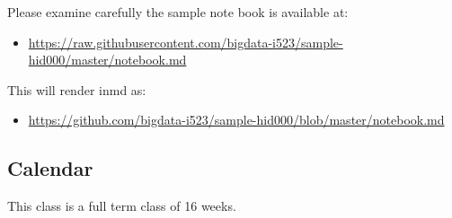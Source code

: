 Please examine carefully the sample note book is available at:

\begin{itemize}

\item
  \url{https://raw.githubusercontent.com/bigdata-i523/sample-hid000/master/notebook.md}
\end{itemize}

This will render inmd as:

\begin{itemize}

\item
  \url{https://github.com/bigdata-i523/sample-hid000/blob/master/notebook.md}
\end{itemize}

\subsection{Calendar}\label{calendar}

This class is a full term class of 16 weeks.

